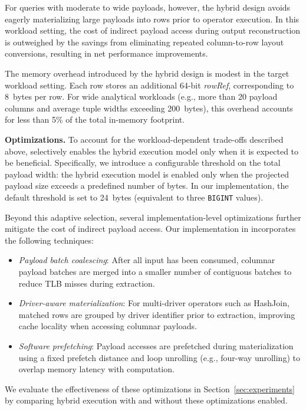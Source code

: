 For queries with moderate to wide payloads, however, the hybrid design avoids eagerly materializing large payloads into rows prior to operator execution.
In this workload setting, the cost of indirect payload access during output reconstruction is outweighed by the savings from eliminating repeated column-to-row layout conversions, resulting in net performance improvements.

The memory overhead introduced by the hybrid design is modest in the target workload setting.
Each row stores an additional 64-bit \emph{rowRef}, corresponding to 8~bytes per row.
For wide analytical workloads (e.g., more than 20 payload columns and average tuple widths exceeding 200~bytes), this overhead accounts for less than 5\% of the total in-memory footprint.



\medskip
\noindent\textbf{Optimizations.}
To account for the workload-dependent trade-offs described above, \proj selectively enables the hybrid execution model only when it is expected to be beneficial.
Specifically, we introduce a configurable threshold on the total payload width: the hybrid execution model is enabled only when the projected payload size exceeds a predefined number of bytes.
In our implementation, the default threshold is set to 24~bytes (equivalent to three \texttt{BIGINT} values).

Beyond this adaptive selection, several implementation-level optimizations further mitigate the cost of indirect payload access.
Our implementation in \proj incorporates the following techniques:

\begin{itemize}[leftmargin=*]
  \item \emph{Payload batch coalescing}: After all input has been consumed, columnar payload batches are merged into a smaller number of contiguous batches to reduce TLB misses during extraction.
  \item \emph{Driver-aware materialization}: For multi-driver operators such as HashJoin, matched rows are grouped by driver identifier prior to extraction, improving cache locality when accessing columnar payloads.
  \item \emph{Software prefetching}: Payload accesses are prefetched during materialization using a fixed prefetch distance and loop unrolling (e.g., four-way unrolling) to overlap memory latency with computation.
\end{itemize}

We evaluate the effectiveness of these optimizations in Section~\ref{sec:experiments} by comparing hybrid execution with and without these optimizations enabled.

